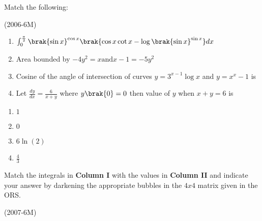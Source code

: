 \iffalse
  \title{Assignment-1}
  \author{Pushkar Gudla-AI24BTECH11012}
  \section{matrix-match}
\fi
		\item Match the following:

			\hfill{(2006-6M)}
			\begin{multicols}{2}
				\begin{enumerate}
				\item$\int_{0}^{\frac{\pi}{2}}\brak{{\sin x}}^{\cos x}\brak{\cos x\cot x-\log\brak{\sin x}^{\sin x}}dx$
				\item Area bounded by $-4y^{2}=x \text{and} x-1=-5y^{2}$
				\item Cosine of the angle of intersection of curves $y=3^{x-1}\log x$ and $y=x^{x}-1$ is
				\item Let $\frac{dy}{dx}=\frac{6}{x+y}$ where $y\brak{0}=0$ then value of $y$ when $x+y=6$ is
				\end{enumerate}
			\columnbreak
				\begin{enumerate}
					\item   $1$
						
					\item $0$

					\item $6\ln(2)$

					\item $\frac{4}{3}$
						
				\end{enumerate}
				\end{multicols}
			\newpage	
			\item Match the integrals in \textbf{Column I} with the values in \textbf{Column II} and indicate your answer by darkening the appropriate bubbles in the $4x4$ matrix given in the ORS. 

			\hfill{(2007-6M)}
			

